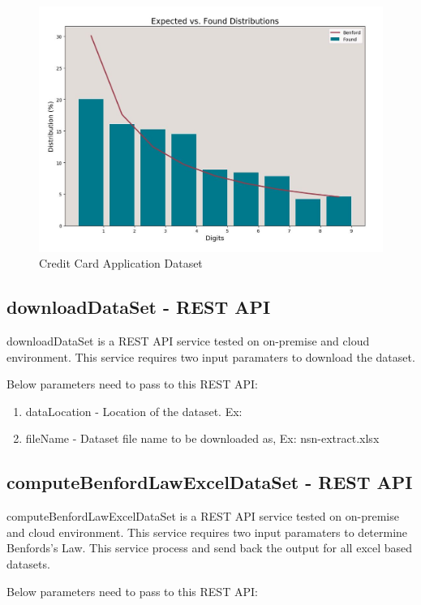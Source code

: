 \begin{figure}[!ht]
\centering\includegraphics[width=\columnwidth]{images/fraudDet_cc_data.JPG}
  \caption{Credit Card Application Dataset}\label{f:aust-cc-data}
\end{figure}


\subsection{downloadDataSet - REST API}
downloadDataSet is a REST API service tested on 
on-premise and cloud environment. This service requires two 
input paramaters to download the dataset.

Below parameters need to pass to this REST API:

\begin{enumerate}
\item dataLocation - Location of the dataset. 
 Ex:~\cite{hid-sp18-514-excelDatalocation}
\item fileName - Dataset file name to be downloaded 
 as, Ex: nsn-extract.xlsx
\end{enumerate}


\subsection{computeBenfordLawExcelDataSet - REST API}
computeBenfordLawExcelDataSet is a REST API service tested on 
on-premise and cloud environment. This service requires two 
input paramaters to determine Benfords's Law. This service
process and send back the output 
for all excel based datasets.

Below parameters need to pass to this REST API:

